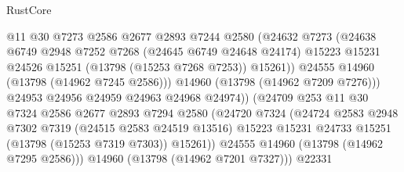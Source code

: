 \begin{lexlean}{RustCore}
\begin{coremodule}
                                  @11
                                  @30
                                  @7273
                                  @2586
                                  @2677
                                  @2893
                                  @7244
                                  @2580
                                  (@24632
                                    @7273
                                    (@24638
                                      @6749
                                      @2948
                                      @7252
                                      @7268
                                      (@24645 @6749 @24648 @24174)
                                      @15223
                                      @15231
                                      @24526
                                      @15251
                                      (@13798 (@15253 @7268 @7253))
                                      @15261))
                                  @24555
                                  @14960
                                  (@13798 (@14962 @7245 @2586)))
                                @14960
                                (@13798 (@14962 @7209 @7276)))
                              @24953
                              @24956
                              @24959
                              @24963
                              @24968
                              @24974))
                          (@24709
                            @253
                            @11
                            @30
                            @7324
                            @2586
                            @2677
                            @2893
                            @7294
                            @2580
                            (@24720
                              @7324
                              (@24724
                                @2583
                                @2948
                                @7302
                                @7319
                                (@24515 @2583 @24519 @13516)
                                @15223
                                @15231
                                @24733
                                @15251
                                (@13798 (@15253 @7319 @7303))
                                @15261))
                            @24555
                            @14960
                            (@13798 (@14962 @7295 @2586)))
                          @14960
                          (@13798 (@14962 @7201 @7327)))
                        @22331

\end{coremodule}
\end{lexlean}
